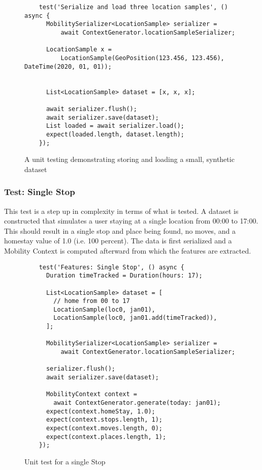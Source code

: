 \begin{figure}
    \centering
    \begin{verbatim}
    test('Serialize and load three location samples', () async {
      MobilitySerializer<LocationSample> serializer =
          await ContextGenerator.locationSampleSerializer;

      LocationSample x =
          LocationSample(GeoPosition(123.456, 123.456), DateTime(2020, 01, 01));


      List<LocationSample> dataset = [x, x, x];

      await serializer.flush();
      await serializer.save(dataset);
      List loaded = await serializer.load();
      expect(loaded.length, dataset.length);
    });
    \end{verbatim}
    \caption{A unit testing demonstrating storing and loading a small, synthetic dataset}
    \label{fig:my_label}
\end{figure}

\subsubsection*{Test: Single Stop}
This test is a step up in complexity in terms of what is tested. A dataset is constructed that simulates a user staying at a single location from 00:00 to 17:00. This should result in a single stop and place being found, no moves, and a homestay value of 1.0 (i.e. 100 percent). The data is first serialized and a Mobility Context is computed afterward from which the features are extracted.

\begin{figure}
    \centering
    \begin{verbatim}
    test('Features: Single Stop', () async {
      Duration timeTracked = Duration(hours: 17);

      List<LocationSample> dataset = [
        // home from 00 to 17
        LocationSample(loc0, jan01),
        LocationSample(loc0, jan01.add(timeTracked)),
      ];

      MobilitySerializer<LocationSample> serializer =
          await ContextGenerator.locationSampleSerializer;

      serializer.flush();
      await serializer.save(dataset);

      MobilityContext context = 
        await ContextGenerator.generate(today: jan01);
      expect(context.homeStay, 1.0);
      expect(context.stops.length, 1);
      expect(context.moves.length, 0);
      expect(context.places.length, 1);
    });
    \end{verbatim}
    \caption{Unit test for a single Stop}
    \label{fig:test-single-stop}
\end{figure}

